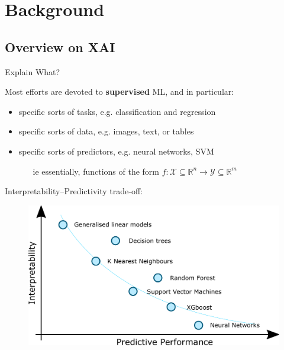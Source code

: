 \documentclass[presentation]{beamer}\mode<presentation>{\usetheme{AMSBolognaFC}}
\begin{document}
\section{Background}

\subsection{Overview on XAI}

\begin{frame}[allowframebreaks]{Explain What?}
    \begin{block}{Most efforts are devoted to \textbf{supervised} ML, and in particular:}
        \begin{itemize}
            \item specific sorts of \alert{tasks}, e.g. classification and regression
            
            \item specific sorts of \alert{data}, e.g. images, text, or tables 
            
            \item specific sorts of \alert{predictors}, e.g. neural networks, SVM
            \begin{itemize}
                \item[ie] essentially, functions of the form $f: \mathcal{X} \subseteq \mathbb{R}^n \rightarrow \mathcal{Y} \subseteq \mathbb{R}^m$
            \end{itemize}
        \end{itemize}
    \end{block}
    
    \framebreak

    Interpretability--Predictivity trade-off:
    \begin{figure}
        \centering
        \includegraphics[width=.7\linewidth]{figures/interpretability-performance-tradeoff.pdf}
    \end{figure}


\end{frame}
\end{document}
